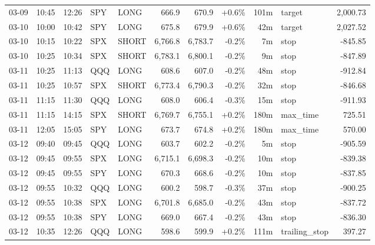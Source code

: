 \documentclass[11pt,a4paper,twoside]{article}
\begin{document}
\begin{center}
\begin{longtable}{>{\color{txtmain}}l l l l l r r r r >{\color{txtmain}}l r}
03-09 & 10:45 & 12:26 & SPY & LONG & 666.9 & 670.9 & \textcolor{wingreen}{+0.6\%} & 101m & target & \textcolor{wingreen}{2,000.73} \\
03-10 & 10:00 & 10:42 & SPY & LONG & 675.8 & 679.9 & \textcolor{wingreen}{+0.6\%} & 42m & target & \textcolor{wingreen}{2,027.52} \\
03-10 & 10:15 & 10:22 & SPX & SHORT & 6,766.8 & 6,783.7 & \textcolor{lossred}{-0.2\%} & 7m & stop & \textcolor{lossred}{-845.85} \\
03-10 & 10:25 & 10:34 & SPX & SHORT & 6,783.1 & 6,800.1 & \textcolor{lossred}{-0.2\%} & 9m & stop & \textcolor{lossred}{-847.89} \\
03-11 & 10:25 & 11:13 & QQQ & LONG & 608.6 & 607.0 & \textcolor{lossred}{-0.2\%} & 48m & stop & \textcolor{lossred}{-912.84} \\
03-11 & 10:25 & 10:57 & SPX & SHORT & 6,773.4 & 6,790.3 & \textcolor{lossred}{-0.2\%} & 32m & stop & \textcolor{lossred}{-846.68} \\
03-11 & 11:15 & 11:30 & QQQ & LONG & 608.0 & 606.4 & \textcolor{lossred}{-0.3\%} & 15m & stop & \textcolor{lossred}{-911.93} \\
03-11 & 11:15 & 14:15 & SPX & SHORT & 6,769.7 & 6,755.1 & \textcolor{wingreen}{+0.2\%} & 180m & max\_time & \textcolor{wingreen}{725.51} \\
03-11 & 12:05 & 15:05 & SPY & LONG & 673.7 & 674.8 & \textcolor{wingreen}{+0.2\%} & 180m & max\_time & \textcolor{wingreen}{570.00} \\
03-12 & 09:40 & 09:45 & QQQ & LONG & 603.7 & 602.2 & \textcolor{lossred}{-0.2\%} & 5m & stop & \textcolor{lossred}{-905.59} \\
03-12 & 09:45 & 09:55 & SPX & LONG & 6,715.1 & 6,698.3 & \textcolor{lossred}{-0.2\%} & 10m & stop & \textcolor{lossred}{-839.38} \\
03-12 & 09:45 & 09:55 & SPY & LONG & 670.3 & 668.6 & \textcolor{lossred}{-0.2\%} & 10m & stop & \textcolor{lossred}{-837.85} \\
03-12 & 09:55 & 10:32 & QQQ & LONG & 600.2 & 598.7 & \textcolor{lossred}{-0.3\%} & 37m & stop & \textcolor{lossred}{-900.25} \\
03-12 & 09:55 & 10:38 & SPX & LONG & 6,701.8 & 6,685.0 & \textcolor{lossred}{-0.2\%} & 43m & stop & \textcolor{lossred}{-837.72} \\
03-12 & 09:55 & 10:38 & SPY & LONG & 669.0 & 667.4 & \textcolor{lossred}{-0.2\%} & 43m & stop & \textcolor{lossred}{-836.30} \\
03-12 & 10:35 & 12:26 & QQQ & LONG & 598.6 & 599.9 & \textcolor{wingreen}{+0.2\%} & 111m & trailing\_stop & \textcolor{wingreen}{397.27} \\

\end{longtable}
\end{center}
\end{document}
